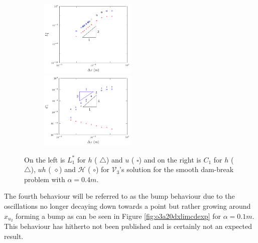 \documentclass[SingleSpace,12pt,Proceedings]{Serre_ASCE}
\begin{document}
\begin{figure}
	\centering
	\begin{subfigure}{\textwidth}
		\includegraphics[width=0.5\textwidth]{pics/results/SDB/Lcon/alpha2.5/1.pdf}
		\includegraphics[width=0.5\textwidth]{pics/results/SDB/Con/9.pdf}
	\end{subfigure}
	\caption{On the left is $L^*_1$ for $h$ ({\color{red} $\triangle$}) and $u$ ({\color{blue} $\square$}) and on the right is $C_1$ for $h$ ({\color{red} $\triangle$}), $uh$ ({\color{black} $\diamond$}) and $\mathcal{H}$ ({\color{blue} $\circ$}) for $\mathcal{V}_3$'s solution for the smooth dam-break problem with $\alpha = 0.4m$.}
	\label{fig:o3a3dxlimmeasure}
\end{figure}


The fourth behaviour will be referred to as the bump behaviour due to the oscillations no longer decaying down towards a point but rather growing around $x_{u_2}$ forming a bump as can be seen in Figure \ref{fig:o3a20dxlimcdexp} for $\alpha = 0.1m$. This behaviour has hitherto not been published and is certainly not an expected result. 
\end{document}
